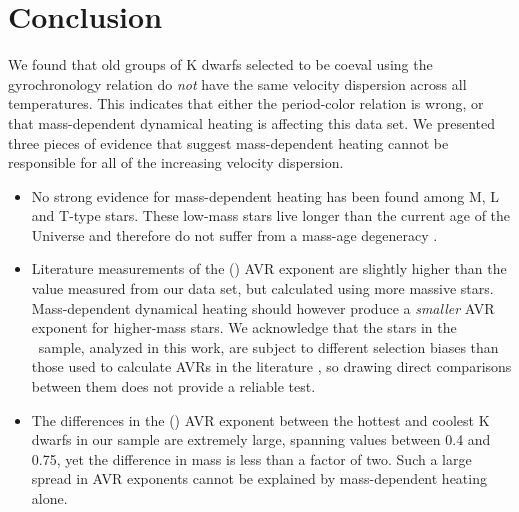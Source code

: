 \section{Conclusion}

We found that old groups of K dwarfs selected to be coeval using the
\citet{angus2019} gyrochronology relation do {\it not} have the same velocity
dispersion across all temperatures.
This indicates that either the \citep{angus2019} period-color relation is
wrong, or that mass-dependent dynamical heating is affecting this data set.
We presented three pieces of evidence that suggest mass-dependent heating
cannot be responsible for all of the increasing velocity dispersion.

\begin{itemize}

\item{
        No strong evidence for mass-dependent heating has been found among M, L
and T-type stars.
These low-mass stars live longer than the current age of the Universe and
        therefore do not suffer from a mass-age degeneracy
        \citep{faherty2009}.
}

\item{
        Literature measurements of the (\vz) AVR exponent are slightly higher
than the value measured from our data set, but calculated using more massive
stars.
Mass-dependent dynamical heating should however produce a {\it smaller} AVR
        exponent for higher-mass stars.
We acknowledge that the stars in the \mct\ sample, analyzed in this work, are
        subject to different selection biases than those used to calculate
        AVRs in the literature \citep{holmberg2009, aumer2009, yu2018}, so
        drawing direct comparisons between them does not provide a reliable
        test.
}

\item{
        The differences in the (\vb) AVR exponent between the hottest and
coolest K dwarfs in our sample are extremely large, spanning values between
0.4 and 0.75, yet the difference in mass is less than a factor of two.
Such a large spread in AVR exponents cannot be explained by mass-dependent
        heating alone.
}

\end{itemize}

